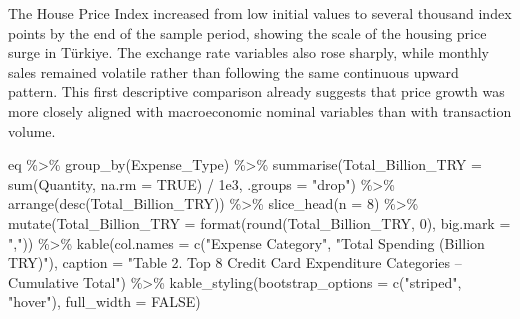 \documentclass[
  11pt,
  a4paper,
]{article}
\newenvironment{Shaded}{\begin{snugshade}}{\end{snugshade}}
\newcommand{\AttributeTok}[1]{\textcolor[rgb]{0.40,0.45,0.13}{#1}}
\newcommand{\ConstantTok}[1]{\textcolor[rgb]{0.56,0.35,0.01}{#1}}
\newcommand{\DecValTok}[1]{\textcolor[rgb]{0.68,0.00,0.00}{#1}}
\newcommand{\FloatTok}[1]{\textcolor[rgb]{0.68,0.00,0.00}{#1}}
\newcommand{\FunctionTok}[1]{\textcolor[rgb]{0.28,0.35,0.67}{#1}}
\newcommand{\NormalTok}[1]{\textcolor[rgb]{0.00,0.23,0.31}{#1}}
\newcommand{\SpecialCharTok}[1]{\textcolor[rgb]{0.37,0.37,0.37}{#1}}
\newcommand{\StringTok}[1]{\textcolor[rgb]{0.13,0.47,0.30}{#1}}
\begin{document}
The House Price Index increased from low initial values to several
thousand index points by the end of the sample period, showing the scale
of the housing price surge in Türkiye. The exchange rate variables also
rose sharply, while monthly sales remained volatile rather than
following the same continuous upward pattern. This first descriptive
comparison already suggests that price growth was more closely aligned
with macroeconomic nominal variables than with transaction volume.

\begin{Shaded}
\begin{Highlighting}[]
\NormalTok{eq }\SpecialCharTok{\%\textgreater{}\%}
  \FunctionTok{group\_by}\NormalTok{(Expense\_Type) }\SpecialCharTok{\%\textgreater{}\%}
  \FunctionTok{summarise}\NormalTok{(}\AttributeTok{Total\_Billion\_TRY =} \FunctionTok{sum}\NormalTok{(Quantity, }\AttributeTok{na.rm =} \ConstantTok{TRUE}\NormalTok{) }\SpecialCharTok{/} \FloatTok{1e3}\NormalTok{, }\AttributeTok{.groups =} \StringTok{"drop"}\NormalTok{) }\SpecialCharTok{\%\textgreater{}\%}
  \FunctionTok{arrange}\NormalTok{(}\FunctionTok{desc}\NormalTok{(Total\_Billion\_TRY)) }\SpecialCharTok{\%\textgreater{}\%}
  \FunctionTok{slice\_head}\NormalTok{(}\AttributeTok{n =} \DecValTok{8}\NormalTok{) }\SpecialCharTok{\%\textgreater{}\%}
  \FunctionTok{mutate}\NormalTok{(}\AttributeTok{Total\_Billion\_TRY =} \FunctionTok{format}\NormalTok{(}\FunctionTok{round}\NormalTok{(Total\_Billion\_TRY, }\DecValTok{0}\NormalTok{), }\AttributeTok{big.mark =} \StringTok{","}\NormalTok{)) }\SpecialCharTok{\%\textgreater{}\%}
  \FunctionTok{kable}\NormalTok{(}\AttributeTok{col.names =} \FunctionTok{c}\NormalTok{(}\StringTok{"Expense Category"}\NormalTok{, }\StringTok{"Total Spending (Billion TRY)"}\NormalTok{),}
        \AttributeTok{caption =} \StringTok{"Table 2. Top 8 Credit Card Expenditure Categories – Cumulative Total"}\NormalTok{) }\SpecialCharTok{\%\textgreater{}\%}
  \FunctionTok{kable\_styling}\NormalTok{(}\AttributeTok{bootstrap\_options =} \FunctionTok{c}\NormalTok{(}\StringTok{"striped"}\NormalTok{, }\StringTok{"hover"}\NormalTok{), }\AttributeTok{full\_width =} \ConstantTok{FALSE}\NormalTok{)}
\end{Highlighting}
\end{Shaded}
\end{document}
